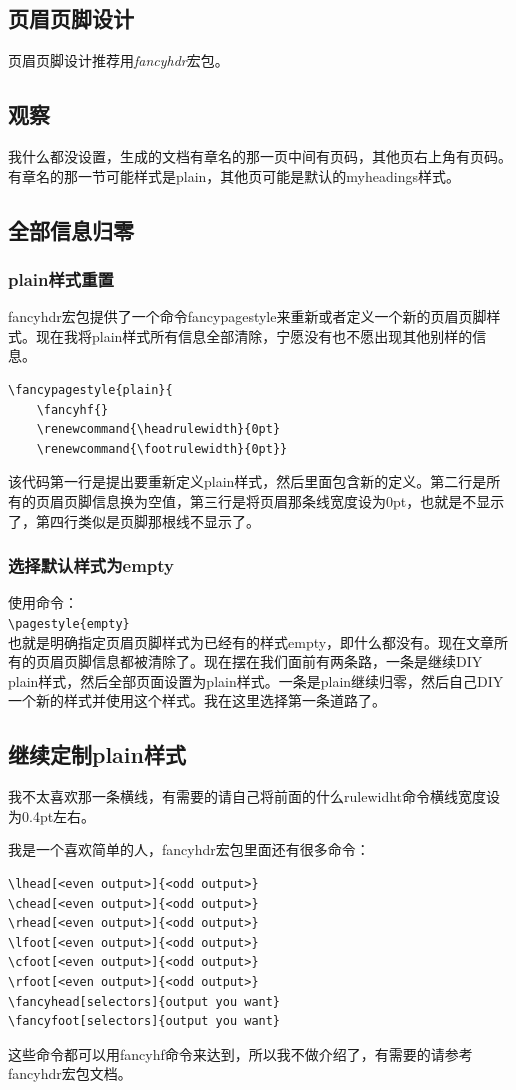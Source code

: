 \documentclass[11pt,oneside]{book}
\begin{document}
\begin{common-format}
\section{页眉页脚设计}
页眉页脚设计推荐用\emph{fancyhdr}宏包。
\subsection{观察}
我什么都没设置，生成的文档有章名的那一页中间有页码，其他页右上角有页码。有章名的那一节可能样式是plain，其他页可能是默认的myheadings样式。

\subsection{全部信息归零}
\subsubsection{plain样式重置}
fancyhdr宏包提供了一个命令fancypagestyle来重新或者定义一个新的页眉页脚样式。现在我将plain样式所有信息全部清除，宁愿没有也不愿出现其他别样的信息。
\begin{Verbatim}
\fancypagestyle{plain}{
    \fancyhf{}
    \renewcommand{\headrulewidth}{0pt}
    \renewcommand{\footrulewidth}{0pt}}
\end{Verbatim}
该代码第一行是提出要重新定义plain样式，然后里面包含新的定义。第二行是所有的页眉页脚信息换为空值，第三行是将页眉那条线宽度设为0pt，也就是不显示了，第四行类似是页脚那根线不显示了。

\subsubsection{选择默认样式为empty}
使用命令：\\
\verb+\pagestyle{empty}+\\
也就是明确指定页眉页脚样式为已经有的样式empty，即什么都没有。现在文章所有的页眉页脚信息都被清除了。现在摆在我们面前有两条路，一条是继续DIY plain样式，然后全部页面设置为plain样式。一条是plain继续归零，然后自己DIY一个新的样式并使用这个样式。我在这里选择第一条道路了。

\subsection{继续定制plain样式}
我不太喜欢那一条横线，有需要的请自己将前面的什么rulewidht命令横线宽度设为0.4pt左右。

我是一个喜欢简单的人，fancyhdr宏包里面还有很多命令：
\begin{Verbatim}
\lhead[<even output>]{<odd output>}
\chead[<even output>]{<odd output>}
\rhead[<even output>]{<odd output>}
\lfoot[<even output>]{<odd output>}
\cfoot[<even output>]{<odd output>}
\rfoot[<even output>]{<odd output>}
\fancyhead[selectors]{output you want}
\fancyfoot[selectors]{output you want}
\end{Verbatim}
这些命令都可以用fancyhf命令来达到，所以我不做介绍了，有需要的请参考fancyhdr宏包文档。


\end{common-format}
\end{document}
